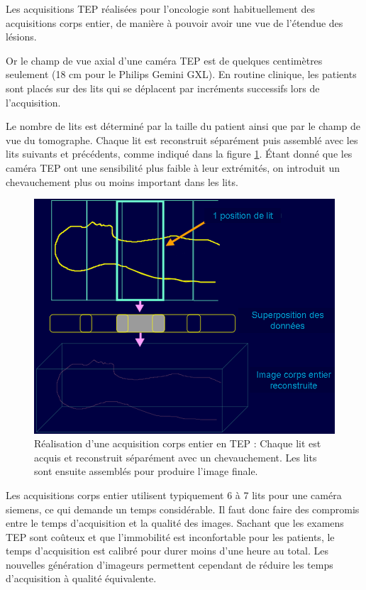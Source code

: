 Les acquisitions TEP réalisées pour l'oncologie sont habituellement des acquisitions corps entier, de manière à pouvoir avoir une vue de l'étendue des lésions.

Or le champ de vue axial d'une caméra TEP est de quelques centimètres seulement (18 cm pour le Philips Gemini GXL). En routine clinique, les patients sont placés sur des lits qui se déplacent par incréments successifs lors de l'acquisition.

Le nombre de lits est déterminé par la taille du patient ainsi que par le champ de vue du tomographe. Chaque lit est reconstruit séparément puis assemblé avec les lits suivants et précédents, comme indiqué dans la figure \ref{fig:multilits}. \'Etant donné que les caméra TEP ont une sensibilité plus faible à leur extrémités, on introduit un chevauchement plus ou moins important dans les lits.

\begin{figure}
\centering
\includegraphics[width=12cm]{images/multilits}
\caption[Acquisitions corps entier en TEP]{Réalisation d'une acquisition corps entier en TEP : Chaque lit est acquis et reconstruit séparément avec un chevauchement. Les lits sont ensuite assemblés pour produire l'image finale.}
\label{fig:multilits}
\end{figure}

Les acquisitions corps entier utilisent typiquement 6 à 7 lits pour une caméra siemens, ce qui demande un temps considérable. Il faut donc faire des compromis entre le temps d'acquisition et la qualité des images. Sachant que les examens TEP sont coûteux et que l'immobilité est inconfortable pour les patients, le temps d'acquisition est calibré pour durer moins d'une heure au total. Les nouvelles génération d'imageurs permettent cependant de réduire les temps d'acquisition à qualité équivalente.

